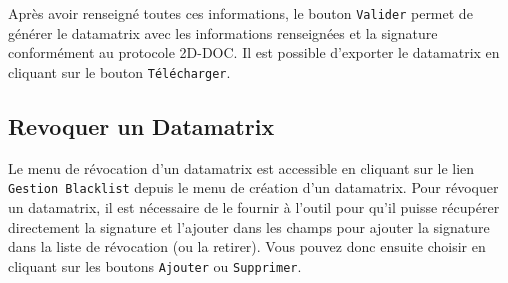 Après avoir renseigné toutes ces informations, le bouton \texttt{Valider} permet de générer le datamatrix avec les informations renseignées et la signature conformément au protocole 2D-DOC. Il est possible d'exporter le datamatrix en cliquant sur le bouton \texttt{Télécharger}.

\subsection{Revoquer un Datamatrix}
Le menu de révocation d'un datamatrix est accessible en cliquant sur le lien \texttt{Gestion Blacklist} depuis le menu de création d'un datamatrix. Pour révoquer un datamatrix, il est nécessaire de le fournir à l'outil pour qu'il puisse récupérer directement la signature et l'ajouter dans les champs pour ajouter la signature dans la liste de révocation (ou la retirer). Vous pouvez donc ensuite choisir en cliquant sur les boutons \texttt{Ajouter} ou \texttt{Supprimer}.